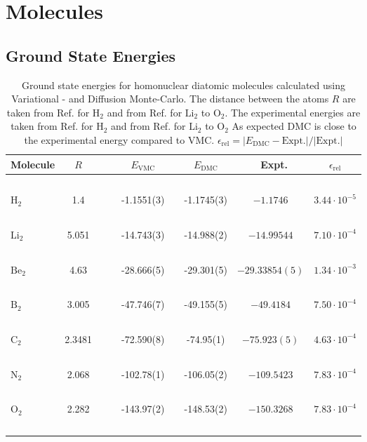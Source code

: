 \section{Molecules}

\subsection{Ground State Energies}
 
\begin{table}
\begin{center}
\begin{tabular}{lcccclccc}
Molecule & $R$ & & \qquad & $E_\mathrm{VMC}$ & & \qquad $E_\mathrm{DMC}$ & \qquad\,\, Expt. & \qquad $\epsilon_\mathrm{rel}$\\
\hline\hline
\ \\
$\mathrm{H_2}$ & 1.4   & &\qquad & -1.1551(3)    & \qquad   & -1.1745(3)   & \qquad $-1.1746$      & \qquad $3.44\cdot 10^{-5}$ \\
\ \\
$\mathrm{Li_2}$& 5.051 & &\qquad & -14.743(3)    & \qquad   & -14.988(2)   & \qquad $-14.99544$    & \qquad $7.10\cdot 10^{-4}$ \\
\ \\
$\mathrm{Be_2}$& 4.63  & &\qquad & -28.666(5)    & \qquad   & -29.301(5)   & \qquad $-29.33854(5)$ & \qquad $1.34\cdot 10^{-3}$  \\
\ \\
$\mathrm{B_2}$ & 3.005 & &\qquad & -47.746(7)    & \qquad   & -49.155(5)   & \qquad $-49.4184$     & \qquad $7.50\cdot 10^{-4}$  \\
\ \\
$\mathrm{C_2}$ & 2.3481& &\qquad & -72.590(8)    & \qquad   & -74.95(1)    & \qquad $-75.923(5)$   & \qquad $4.63\cdot 10^{-4}$  \\
\ \\
$\mathrm{N_2}$ & 2.068 & &\qquad & -102.78(1)    & \qquad   & -106.05(2)   & \qquad $-109.5423$    & \qquad $7.83\cdot 10^{-4}$  \\
\ \\
$\mathrm{O_2}$ & 2.282 & &\qquad & -143.97(2)    & \qquad   & -148.53(2)   & \qquad $-150.3268$    & \qquad $7.83\cdot 10^{-4}$  \\
\ \\
\end{tabular}
\caption{Ground state energies for homonuclear diatomic molecules calculated using Variational - and Diffusion Monte-Carlo. The distance between the atoms $R$ are taken from Ref. \cite{H_He_exact} for $\mathrm{H_2}$ and from Ref. \cite{UmrigarMolecules} for $\mathrm{Li_2}$ to $\mathrm{O_2}$. The experimental energies are taken from Ref. \cite{H_He_exact} for $\mathrm{H_2}$ and from Ref. \cite{ExactMolecules} for $\mathrm{Li_2}$ to $\mathrm{O_2}$ As expected DMC is close to the experimental energy compared to VMC. $\epsilon_\mathrm{rel} = |E_\mathrm{DMC} - \mathrm{Expt.}|/|\mathrm{Expt.}|$}
\label{tab:AtomsRes}
\end{center}
\end{table}


